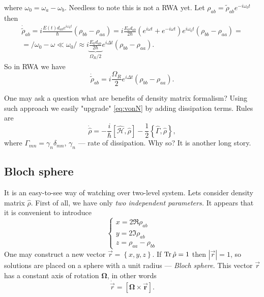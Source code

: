 where $\omega_0 = \omega_a - \omega_b$. Needless to note this is not a RWA yet. Let $\rho_{ab} = \widetilde{\rho}_{ab} e^{-i \omega_0 t}$ then
\begin{multline}
	\dot{\widetilde{\rho}}_{ab} = i \frac{E(t) d_{ab} e^{i \omega_0 t}}{\hbar} \left( \rho_{bb} - \rho_{aa} \right) = i \frac{E_0 d_{ab}}{2 \hbar} \left( e^{i \omega t} + e^{- i \omega t} \right) e^{i \omega_0 t} \left( \rho_{bb} - \rho_{aa} \right) = \\ = \Big/ \omega_0 - \omega \ll \omega_0 \Big/ \approx 
	i \underbrace{\frac{E_0 d_{ab}}{2 \hbar}}_{\Omega_R/2} e^{i \Delta t}\left( \rho_{bb} - \rho_{aa} \right).
\end{multline}
So in RWA we have
\begin{equation}
	\dot{\widetilde{\rho}}_{ab} = i \frac{\Omega_R}{2} e^{i \Delta t} \left( \rho_{bb} - \rho_{aa} \right).
\end{equation}

One may ask a question what are benefits of density matrix formalism? Using such approach we easily "upgrade" \eqref{eq:vonN} by adding dissipation terms. Rules are
\begin{equation}
	\dot{\hat{\rho}} = - \frac{i}{\hbar} \left[ \hat{\mathscr{H}}, \hat{\rho} \right] - \frac{1}{2} \left\{ \hat{\Gamma}, \hat{\rho} \right\},
\end{equation}
where $\Gamma_{mn} = \gamma_{n} \delta_{mn}$, $\gamma_n$ --- rate of dissipation. Why so? It is another long story.

\subsection{Bloch sphere}

It is an easy-to-see way of watching over two-level system. Lets consider density matrix $\hat{\rho}$. First of all, we have only \textit{two independent parameters.} It appears that it is convenient to introduce
\begin{equation}
	\begin{cases}
		x = 2 \Re \rho_{ab} \\
		y = 2 \Im \rho_{ab} \\
		z = \rho_{aa} - \rho_{bb}
	\end{cases}
	\label{eq:tmp_system}
\end{equation} 
One may construct a new vector $\vec{r} = \left\{ x,y,z \right\}$. If $\operatorname{Tr} \hat{\rho} = 1$ then $\left|\vec{r}\right| = 1$, so solutions are placed on a sphere with a unit radius --- \textit{Bloch sphere}.
This vector $\vec{r}$ has a constant axis of rotation $\bm{\Omega}$, in other words
\begin{equation}
	\dot{\vec{r}} = \left[ \bm{\Omega \times \vec{r}} \right].
\end{equation}

